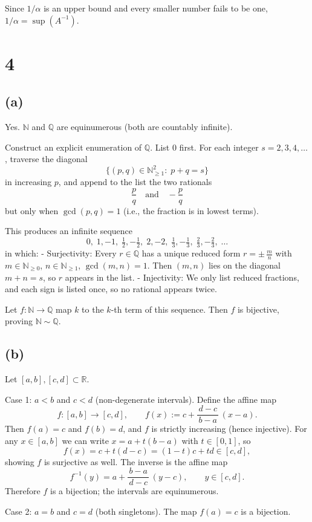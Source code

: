 \documentclass[12pt,a4paper]{article}
\theoremstyle{definition}
\theoremstyle{remark}
\begin{document}
Since $1/\alpha$ is an upper bound and every smaller number fails to be one, $1/\alpha=\sup(A^{-1})$.


\section*{4}
\subsection*{(a)}
Yes. $\mathbb{N}$ and $\mathbb{Q}$ are equinumerous (both are countably infinite).

Construct an explicit enumeration of $\mathbb{Q}$.
List $0$ first. For each integer $s=2,3,4,\dots$, traverse the diagonal
\[
\{(p,q)\in\mathbb{N}_{\ge1}^2:\; p+q=s\}
\]
in increasing $p$, and append to the list the two rationals
\[
\frac{p}{q}\quad\text{and}\quad -\frac{p}{q}
\]
but only when $\gcd(p,q)=1$ (i.e., the fraction is in lowest terms).

This produces an infinite sequence
\[
0,\; 1,-1,\; \tfrac12,-\tfrac12,\; 2,-2,\; \tfrac13,-\tfrac13,\; \tfrac23,-\tfrac23,\; \dots
\]
in which:
- Surjectivity: Every $r\in\mathbb{Q}$ has a unique reduced form $r=\pm\,\frac{m}{n}$ with $m\in\mathbb{N}_{\ge0}$, $n\in\mathbb{N}_{\ge1}$, $\gcd(m,n)=1$. Then $(m,n)$ lies on the diagonal $m+n=s$, so $r$ appears in the list.
- Injectivity: We only list reduced fractions, and each sign is listed once, so no rational appears twice.

Let $f:\mathbb{N}\to\mathbb{Q}$ map $k$ to the $k$-th term of this sequence. Then $f$ is bijective, proving $\mathbb{N}\sim\mathbb{Q}$.

\subsection*{(b)}
Let $[a,b],[c,d]\subset\mathbb{R}$.

Case 1: $a<b$ and $c<d$ (non-degenerate intervals). Define the affine map
\[
f:[a,b]\to[c,d],\qquad f(x):=c+\frac{d-c}{\,b-a\,}\,(x-a).
\]
Then $f(a)=c$ and $f(b)=d$, and $f$ is strictly increasing (hence injective).
For any $x\in[a,b]$ we can write $x=a+t(b-a)$ with $t\in[0,1]$, so
\[
f(x)=c+t(d-c)=(1-t)c+td\in[c,d],
\]
showing $f$ is surjective as well. The inverse is the affine map
\[
f^{-1}(y)=a+\frac{b-a}{\,d-c\,}\,(y-c),\qquad y\in[c,d].
\]
Therefore $f$ is a bijection; the intervals are equinumerous.

Case 2: $a=b$ and $c=d$ (both singletons). The map $f(a)=c$ is a bijection.
\end{document}
